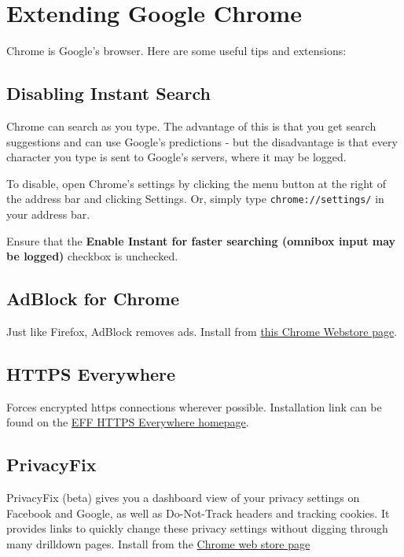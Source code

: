 \section{Extending Google Chrome}

Chrome is Google's browser. Here are some useful tips and extensions:

\subsection{Disabling Instant Search}

Chrome can search as you type. The advantage of this is that you get
search suggestions and can use Google's predictions - but the
disadvantage is that every character you type is sent to Google's
servers, where it may be logged.

To disable, open Chrome's settings by clicking the menu button at the
right of the address bar and clicking Settings. Or, simply type
\verb!chrome://settings/! in your address bar.

Ensure that the \textbf{Enable Instant for faster searching (omnibox
input may be logged)} checkbox is unchecked.

\subsection{AdBlock for Chrome}

Just like Firefox, AdBlock removes ads. Install from
\href{https://chrome.google.com/webstore/detail/adblock/gighmmpiobklfepjocnamgkkbiglidom}{this
Chrome Webstore page}.

\subsection{HTTPS Everywhere}

Forces encrypted https connections wherever possible. Installation link
can be found on the \href{https://www.eff.org/https-everywhere}{EFF
HTTPS Everywhere homepage}.

\subsection{PrivacyFix}

PrivacyFix (beta) gives you a dashboard view of your privacy settings on
Facebook and Google, as well as Do-Not-Track headers and tracking
cookies. It provides links to quickly change these privacy settings
without digging through many drilldown pages. Install from the
\href{https://chrome.google.com/webstore/detail/privacyfix-by-privacychoi/pmejhjjecaldkllonlokhkglbdbkdcni}{Chrome
web store page}
